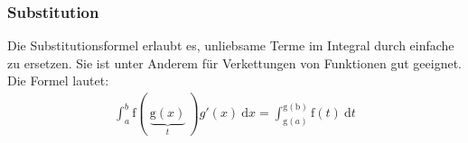 \documentclass[11pt, a4paper]{article}
\newcommand{\intend}[1][]{\ \mathrm{d}#1}
\newif\ifshowsolution
\begin{document}
\begin{enumerate}
	\ifshowsolution
		\begin{align*}
			\intertext{Polynom dritten Grades: eine Nullstelle raten, dann per Polynomdivision faktorisieren}
			\int_2^3 \frac{x-1}{x^3 + 4x^2 + 5x + 2} dx &= \int_2^3 \frac{x-1}{(x+1)^2 (x+2)} dx \\
			\intertext{Bei einem Polynom dritten Grades sieht der Ansatz folgendermaßen aus}
			\frac{x-1}{(x+1)^2 (x+2)} &= \frac{A}{x+1} + \frac{B}{(x+1)^2} + \frac{C}{x+2} \\
			&= \frac{A(x+1)(x+2) + B(x+2) + C(x+1)^2}{(x+1)^2 (x+2)} \\
			\intertext{Wir setzen die Zähler gleich und erhalten durch Koeffizientenvergleich ein Gleichungssystem}
			x-1 &= A(x+1)(x+2) + B(x+2) + C(x+1)^2 \\
			\underline{\underline{0x^2}} + \underline{x} \ \uwave{- 1} &=
			\underline{\underline{Ax^2}} + \underline{3Ax} + \uwave{2A} + \underline{Bx} + \uwave{2B} + \underline{\underline{Cx^2}} + \underline{2Cx} + \uwave{C} \\
			\rightarrow \begin{cases}
				0 = A + C \\
				1 = 3A + B + 2C \\
				-1 = 2A + 2B + C
			\end{cases}
			&\rightarrow \begin{cases}
				C = -A \\
				1 = A + B \\
				-2 = B
			\end{cases} \\
			&\Rightarrow A=3, B=-2, C=-3 \\
			\intertext{Einsetzen der Werte für $A$, $B$ und $C$ in den Ansatz ergibt}
			\frac{x-1}{(x+1)^2 (x+2)} &= \frac{3}{x+1} - \frac{2}{(x+1)^2} - \frac{3}{x+2} \\
			\intertext{Das Integral kann mit dieser Form gelöst werden.}
			\int_2^3 \frac{x-1}{x^3 + 4x^2 + 5x + 2} dx &= \int_2^3 \frac{3}{x+1} - \frac{2}{(x+1)^2} - \frac{3}{x+2} dx \\
			&= \int_2^3 \frac{3}{x+1} dx - \int_2^3 \frac{2}{(x+1)^2} dx - \int_2^3 \frac{3}{x+2} dx \\
			&= 3 \left. \ln(x+1) \right|_2^3 + \left. \frac{2}{x+2} \right|_2^3 - 3 \left. \ln(x+2) \right|_2^3 \\
			&\approx 0.0269
		\end{align*}
	\fi
\end{enumerate}

\subsubsection{Substitution}
Die Substitutionsformel erlaubt es, unliebsame Terme im Integral durch einfache zu ersetzen. Sie ist unter Anderem für Verkettungen von Funktionen gut geeignet. Die Formel lautet:
\begin{align*}
	\int_a^b \mathrm{f}( \ \underbrace{\mathrm{g}(x)}_t \ ) g'(x) \intend{x} = \int_{\mathrm{g}(a)}^{\mathrm{g(b)}} \mathrm{f}(t) \intend{t}
\end{align*}
\end{document}
